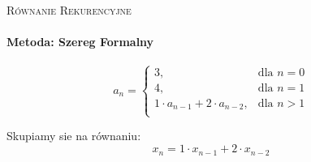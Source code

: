 \documentclass[12pt]{article}
\begin{document}
  \begin{center}  \LARGE\textsc{Równanie  Rekurencyjne}  \end{center}  
  \paragraph{Metoda: Szereg Formalny}    
 \begin{equation}{{a}}_{{n}} = \begin{cases}  {3}, &  \text{dla } n = 0 \\ {4}, &  \text{dla } n = 1 \\ {1}\cdot{{a}}_{{n-1}} + {2}\cdot{{a}}_{{n-2}}, &  \text{dla } n > 1 \\\end{cases}\end{equation}

\noindent Skupiamy sie na równaniu:
\begin{equation} {{x}}_{{n}} = {1}\cdot{{x}}_{{n-1}} + {2}\cdot{{x}}_{{n-2}}\end{equation}
\end{document}
